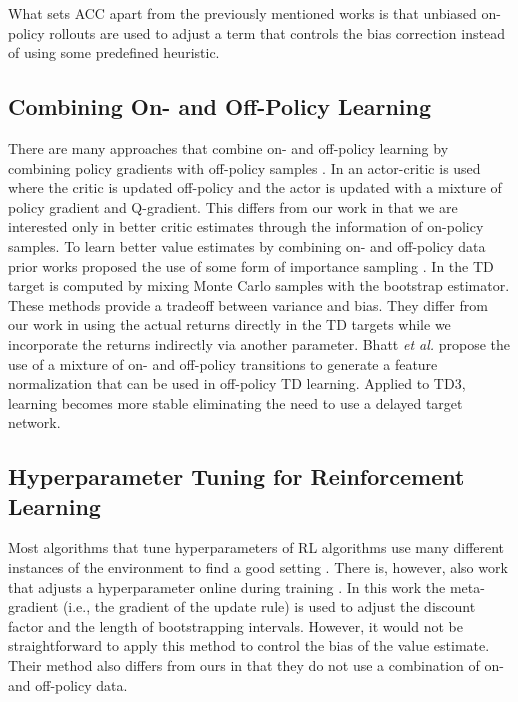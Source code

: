 What sets ACC apart from the previously mentioned works is that unbiased on-policy rollouts are used to adjust a term that controls the bias correction instead of using some predefined heuristic. 






\subsection{Combining On- and Off-Policy Learning}
There are many approaches that combine on- and off-policy learning by combining policy gradients with off-policy samples
\cite{degris2012off,NIPS2010_35cf8659,o2016combining}.
In \cite{NIPS2017_IPG} an actor-critic is used where the critic is updated off-policy and the actor is updated with a mixture of policy gradient and Q-gradient. This differs from our work in that we are interested only in better critic estimates through the information of on-policy samples. 
To learn better value estimates by combining on- and off-policy data prior works proposed the use of some form of importance sampling
\cite{NIPS2014_be53ee61,precup2000eligibility}.
In \cite{hausknecht2016policy} the TD target is computed by mixing Monte Carlo samples with the bootstrap estimator.
These methods provide a tradeoff between variance and bias. They differ from our work in using the actual returns directly in the TD targets while we incorporate the returns indirectly via another parameter.
Bhatt \emph{et al.} \cite{bhatt2019crossnorm} propose the use of a mixture of on- and off-policy transitions to generate a feature normalization that can be used in off-policy TD learning. Applied to TD3, learning becomes more stable eliminating the need to use a delayed target network.



\subsection{Hyperparameter Tuning for Reinforcement Learning}

Most algorithms that tune hyperparameters of RL algorithms use many different instances of the environment to find a good setting
\cite{chiang19,falkner18a,jaderberg2017population}. 
There is, however, also work that adjusts a hyperparameter online during training \cite{xu2018meta}. In this work the meta-gradient (i.e., the gradient of the update rule) is used to adjust the discount factor and the length of bootstrapping intervals. However, it would not be straightforward to apply this method to control the bias of the value estimate. Their method also differs from ours in that they do not use a combination of on- and off-policy data.



